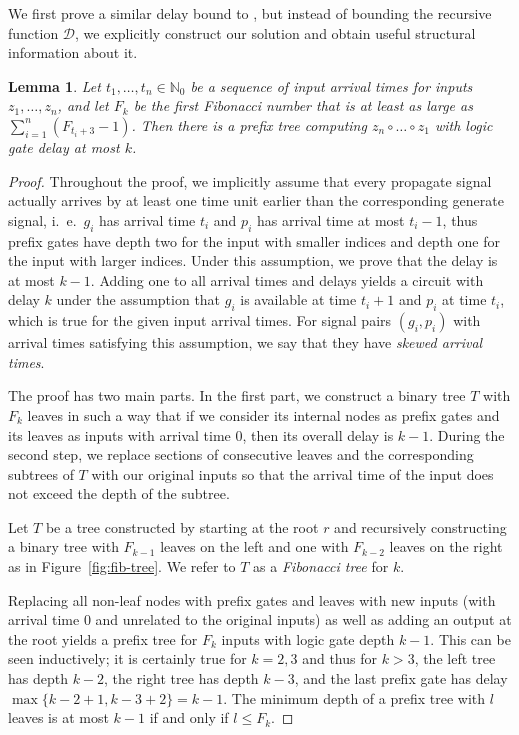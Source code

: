 \documentclass[11pt,final,microtype]{scrartcl}
\theoremstyle{plain}
\newtheorem{lemma}[theorem]{Lemma}
\theoremstyle{definition}
\theoremstyle{remark}
\newcommand{\tikzfigs}[3]{
  \begin{figure}[!tb]\centering{\resizebox{#2\linewidth}{!}{\begin{tikzpicture}
          
        \end{tikzpicture}}\caption{#1}\label{fig:#3}}\end{figure}}
\begin{document}
We first prove a similar delay bound to \cite{bonn1}, but instead of
bounding the recursive function $\mathcal{D}$, we explicitly construct
our solution and obtain useful structural information about it.

\begin{lemma} \label{lem:fib-pfx} Let $t_1, \dots, t_n \in
  \mathbb{N}_0$ be a sequence of input arrival times for inputs $z_1,
  \dots, z_n$, and let $F_k$ be the first Fibonacci number that is
  at least as large as $\sum_{i=1}^{n} (F_{t_i + 3} - 1)$. Then there
  is a prefix tree computing $z_n \circ \dots \circ z_1$ with
  logic gate delay at most $k$.
\end{lemma} 

\begin{proof}
Throughout the proof, we implicitly assume that every propagate signal
actually arrives by at least one time unit earlier than the
corresponding generate signal, i.\ e.\ $g_i$ has arrival time $t_i$
and $p_i$ has arrival time at most $t_i - 1$, thus prefix gates have
depth two for the input with smaller indices and depth one for the
input with larger indices. Under this assumption, we prove that the
delay is at most $k-1$. Adding one to all arrival times and delays
yields a circuit with delay $k$ under the assumption that $g_i$ is
available at time $t_i + 1$ and $p_i$ at time $t_i$, which is true for
the given input arrival times. For signal pairs $(g_i,p_i)$ with
arrival times satisfying this assumption, we say that they have
\emph{skewed arrival times}.

  The proof has two main parts. In the first part, we construct a
  binary tree $T$ with $F_k$ leaves in such a way that if we consider
  its internal nodes as prefix gates and its leaves as inputs with
  arrival time 0, then its overall delay is $k-1$. During the second
  step, we replace sections of consecutive leaves and the
  corresponding subtrees of $T$ with our original inputs so that the
  arrival time of the input does not exceed the depth of the subtree.

  Let $T$ be a tree constructed by starting at the root $r$ and
  recursively constructing a binary tree with $F_{k-1}$ leaves on the
  left and one with $F_{k-2}$ leaves on the right as in
  Figure~\ref{fig:fib-tree}. We refer to $T$ as a \emph{Fibonacci
    tree} for $k$.

  \tikzfigs{Fibonacci tree $T$ for $k = 8$}{0.55}{fib-tree}

  Replacing all non-leaf nodes with prefix gates and leaves with new
  inputs (with arrival time 0 and unrelated to the original inputs) as
  well as adding an output at the root yields a prefix tree for $F_k$
  inputs with logic gate depth $k-1$. This can be seen inductively; it
  is certainly true for $k = 2, 3$ and thus for $k > 3$, the left tree
  has depth $k-2$, the right tree has depth $k-3$, and the last prefix
  gate has delay $\max\{k-2+1, k-3+2\} = k-1$. The minimum depth of a
  prefix tree with $l$ leaves is at most $k-1$ if and only if $l \leq
  F_k$.


\end{proof}
\end{document}
